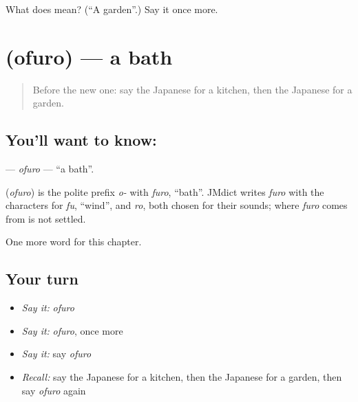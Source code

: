 \begin{tcolorbox}[breakable,colback=teal!4,colframe=teal!35!black,title={Before you move on}]
What does  mean? (\textquotedblleft{}A garden\textquotedblright{}.) Say it once more.
\end{tcolorbox}
\section[\texorpdfstring{\ja{おふろ} (ofuro)}{おふろ (ofuro)}]{ (ofuro) — a bath}

\label{lesson:JA-C39-ofuro}



\begin{quote}
Before the new one: say the Japanese for a kitchen, then the Japanese for a garden.
\end{quote}

\subsection*{You'll want to know: }
\textbf{} — \emph{ofuro} — \textquotedblleft{}a bath\textquotedblright{}.

\begin{cousinweb}
\textbf{} (\emph{ofuro}) is the polite prefix \emph{o-} with \emph{furo}, \textquotedblleft{}bath\textquotedblright{}. JMdict writes \emph{furo} with the characters for \emph{fu}, \textquotedblleft{}wind\textquotedblright{}, and \emph{ro}, both chosen for their sounds; where \emph{furo} comes from is not settled.
\end{cousinweb}

\begin{grammarlens}[title={What you've built}]
One more word for this chapter.
\end{grammarlens}

\subsection*{Your turn}
\begin{itemize}
\raggedright
  \item \emph{Say it:} \emph{ofuro}
  \item \emph{Say it:} \emph{ofuro}, once more
  \item \emph{Say it:} say \emph{ofuro}
  \item \emph{Recall:} say the Japanese for a kitchen, then the Japanese for a garden, then say \emph{ofuro} again
\end{itemize}

